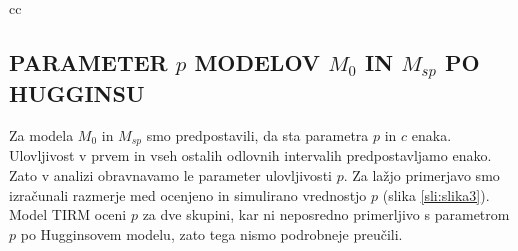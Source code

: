 \begin{table}[!htb]
\begin{tabular}{cc}
    \begin{minipage}{.33\linewidth}
      \caption*{Normalna funkcija}
    \end{minipage}%

    \begin{minipage}{.33\linewidth}
      \caption*{Razlike med matrikama}
    \end{minipage}
\end{tabular}
\end{table}

\subsection{PARAMETER $p$ MODELOV $M_0$ IN $M_{sp}$ PO HUGGINSU}
Za modela $M_0$ in $M_{sp}$ smo predpostavili, da sta parametra $p$ in $c$ enaka. Ulovljivost v prvem in vseh ostalih odlovnih intervalih predpostavljamo enako. Zato v analizi obravnavamo le parameter ulovljivosti $p$. Za lažjo primerjavo smo izračunali razmerje med ocenjeno in simulirano vrednostjo $p$ (slika \ref{sli:slika3}). Model TIRM oceni $p$ za dve skupini, kar ni neposredno primerljivo s parametrom $p$ po Hugginsovem modelu, zato tega nismo podrobneje preučili.

